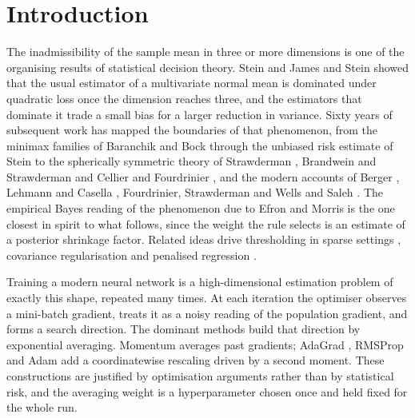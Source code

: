 \documentclass[pdflatex,sn-mathphys-num]{sn-jnl}%
\theoremstyle{thmstyleone}%
\theoremstyle{thmstyletwo}%
\theoremstyle{thmstylethree}%
\begin{document}

\maketitle

\section{Introduction}
\label{sec:introduction}

The inadmissibility of the sample mean in three or more dimensions is one of the organising results of statistical decision theory. Stein \cite{stein1956} and James and Stein \cite{james1961} showed that the usual estimator of a multivariate normal mean is dominated under quadratic loss once the dimension reaches three, and the estimators that dominate it trade a small bias for a larger reduction in variance. Sixty years of subsequent work has mapped the boundaries of that phenomenon, from the minimax families of Baranchik \cite{baranchik1970} and Bock \cite{bock1975} through the unbiased risk estimate of Stein \cite{stein1981} to the spherically symmetric theory of Strawderman \cite{strawderman1974}, Brandwein and Strawderman \cite{brandwein1990, brandwein2012} and Cellier and Fourdrinier \cite{cellier1995, cellier1995b}, and the modern accounts of Berger \cite{berger1985}, Lehmann and Casella \cite{lehmann1998}, Fourdrinier, Strawderman and Wells \cite{fourdrinier2018} and Saleh \cite{saleh2006}. The empirical Bayes reading of the phenomenon due to Efron and Morris \cite{efronmorris1973, efronmorris1976, efron2012} is the one closest in spirit to what follows, since the weight the rule selects is an estimate of a posterior shrinkage factor. Related ideas drive thresholding in sparse settings \cite{donoho1994}, covariance regularisation \cite{ledoit2004} and penalised regression \cite{saleh2019}.

Training a modern neural network is a high-dimensional estimation problem of exactly this shape, repeated many times. At each iteration the optimiser observes a mini-batch gradient, treats it as a noisy reading of the population gradient, and forms a search direction. The dominant methods build that direction by exponential averaging. Momentum \cite{polyak1964, sutskever2013} averages past gradients; AdaGrad \cite{duchi2011}, RMSProp \cite{tieleman2012} and Adam \cite{kingma2015} add a coordinatewise rescaling driven by a second moment. These constructions are justified by optimisation arguments rather than by statistical risk, and the averaging weight is a hyperparameter chosen once and held fixed for the whole run.
\end{document}
